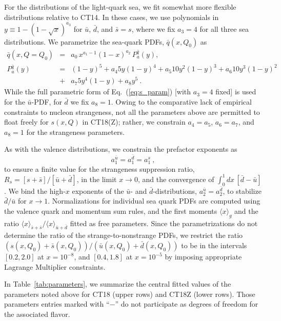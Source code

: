 For the distributions of the light-quark sea, we fit somewhat
more flexible distributions relative to CT14. In these cases, we use
polynomials in $y\! \equiv\! 1\! -\! (1\! -\! \sqrt{x})^{a_3}$ for
$\bar{u}$, $\bar{d}$, and $\bar{s}=s$, where we fix $a_3\! =\! 4$ for
all three sea distributions.
We parametrize the sea-quark PDFs, $\bar{q}(x,Q_0)$ as
\begin{eqnarray}
\label{eq:s_param}
\bar{q}(x,Q=Q_0) &=& a_0\, x^{a_1-1}(1-x)^{a_2}\,P^{\bar{q}}_a(y), \\
P^{\bar{q}}_a(y) &=&             (1-y)^5 + 
a_4   5 y   (1-y)^4 + 
a_5  10 y^2 (1-y)^3 + 
a_6  10 y^3 (1-y)^2   \nonumber \\
&+& a_7   5 y^4 (1-y)   + 
a_8     y^5\ . \nonumber 
\end{eqnarray}
While the full parametric form of Eq.~(\ref{eq:s_param}) [with $a_3 = 4$ fixed] is used
for the $\bar{u}$-PDF, for $\bar{d}$ we fix $a_8=1$. Owing to the comparative lack of empirical constraints to nucleon strangeness, not all the parameters above are permitted to float freely for $s(x,Q)$ in CT18(Z); rather, we constrain $a_4\! =\! a_5$, $a_6\! =\! a_7$, and $a_8=1$ for the strangeness parameters.

As with the valence distributions, we constrain the prefactor exponents as
\begin{equation}
	a^{\bar{u}}_1 = a^{\bar{d}}_1 = a^s_1\ ,
\label{eq:ubar_exp}
\end{equation}
to ensure a finite value for the strangeness suppression ratio, $R_s\! =\! [s+\bar{s}] \big/ [\bar{u}+\bar{d}]$,
in the limit $x\!\to\!0$, and the convergence of $\int^1_0 dx\, [\bar{d}-\bar{u}]$. We bind the high-$x$ exponents of the $\bar{u}$- and $\bar{d}$-distributions, $a^{\bar{u}}_2\! =\! a^{\bar{d}}_2$, to stabilize $\bar{d}/\bar{u}$ for $x\!\to\!1$. Normalizations for individual sea quark PDFs are computed using the valence quark and momentum sum rules, and the first moments $\langle x \rangle_{g}$ and the ratio $\langle x\rangle_{\bar s+\bar s}/\langle x\rangle_{\bar u+\bar d}$ fitted as free parameters. Since the parametrizations do not determine the ratio of the strange-to-nonstrange PDFs, we restrict the ratio $\left(s(x,Q_0) + \bar s(x,Q_0)\right)/\left(\bar u(x,Q_0) + \bar d(x,Q_0)\right)$ to be in the intervals $[0.2, 2.0]$ at $x=10^{-8}$, and $[0.4, 1.8]$ at $x=10^{-5}$ by imposing appropriate Lagrange Multiplier constraints.

In Table~\ref{tab:parameters}, we summarize the central fitted values of the parameters noted above for CT18 (upper rows) and CT18Z (lower rows). Those parameters entries marked with ``$-$'' do not participate as degrees of freedom for the associated flavor.

